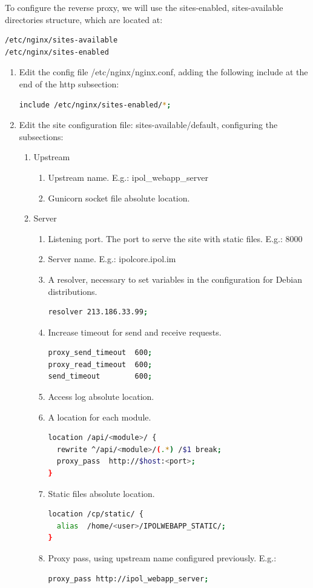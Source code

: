 \documentclass[a4paper,12pt]{article}
\begin{document}
To configure the reverse proxy, we will use the sites-enabled, sites-available directories structure, which are located at:
\begin{lstlisting}[language=Bash]
/etc/nginx/sites-available
/etc/nginx/sites-enabled
\end{lstlisting}

\begin{enumerate}
\item Edit the config file /etc/nginx/nginx.conf, adding the following include at the end of the http subsection:
\begin{lstlisting}[language=Bash]
include /etc/nginx/sites-enabled/*;
\end{lstlisting}
\item Edit the site configuration file: sites-available/default, configuring the subsections:
\begin{enumerate}
\item Upstream
\begin{enumerate}
\item Upstream name. E.g.: ipol\_webapp\_server
\item Gunicorn socket file absolute location.
\end{enumerate}
\item Server
\begin{enumerate}
\item Listening port. The port to serve the site with static files. E.g.: 8000
\item Server name. E.g.: ipolcore.ipol.im
\item A resolver, necessary to set variables in the configuration for Debian distributions.
\begin{lstlisting}[language=Bash]
resolver 213.186.33.99;
\end{lstlisting}
\item Increase timeout for send and receive requests.
\begin{lstlisting}[language=Bash]
proxy_send_timeout	600;
proxy_read_timeout	600;
send_timeout		600;
\end{lstlisting}
\item Access log absolute location.
\item A location for each module.
\begin{lstlisting}[language=Bash]
location /api/<module>/ {
  rewrite ^/api/<module>/(.*) /$1 break;
  proxy_pass  http://$host:<port>;
}
\end{lstlisting}
\item Static files absolute location.
\begin{lstlisting}[language=Bash]
location /cp/static/ {
  alias  /home/<user>/IPOLWEBAPP_STATIC/;
}
\end{lstlisting}
\item Proxy pass, using upstream name configured previously.
E.g.:
\begin{lstlisting}[language=Bash]
proxy_pass http://ipol_webapp_server;
\end{lstlisting}


\end{enumerate}
\end{enumerate}
\end{enumerate}
\end{document}
